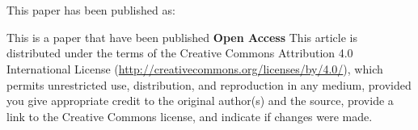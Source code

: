 
\fancyhead[LE]{} 
\fancyhead[RO]{}

\setcounter{section}{0}
\setcounter{table}{0}
\setcounter{figure}{0}
\setcounter{equation}{0}
\setcounter{footnote}{0}

\chapter*{} %

\thispagestyle{empty}

\newpage
\thispagestyle{empty}
\vspace*{\fill}

This paper has been published as: 

This is a paper that have been published
\textbf{Open Access} This article is distributed under the terms of the Creative Commons Attribution 4.0 International License (\url{http://creativecommons.org/licenses/by/4.0/}), which permits unrestricted use, distribution, and reproduction in any medium, provided you give appropriate credit to the original author(s) and the source, provide a link to the Creative Commons license, and indicate if changes were made.

